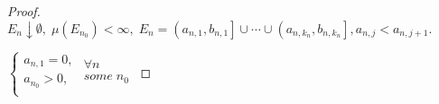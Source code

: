 \begin{proof}
	${E_n} \downarrow \emptyset ,\;\mu \left( {{E_{{n_0}}}} \right) < \infty ,\;{E_n} = \left( {{a_{n,1}},{b_{n,1}}} \right] \cup  \cdots  \cup \left( {{a_{n,{k_n}}},{b_{n,{k_n}}}} \right],{a_{n,j}} < {a_{n,j + 1}}.$ 
	
	$\left\{ {\begin{matrix}
		{{a_{n,1}} = 0,}  \\ 
		{{a_{{n_0}}} > 0,}  \\ 
		
		\end{matrix} } \right.\begin{matrix}
	{\forall n}  \\ 
	{some\;{n_0}}  \\ 
	
	\end{matrix} $
\end{proof}

